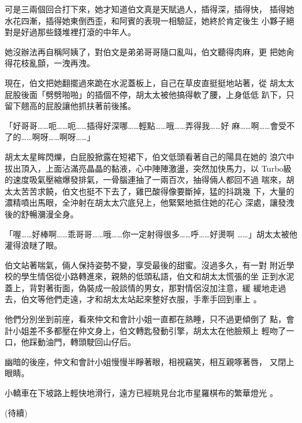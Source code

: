 可是三兩個回合打下來，她才知道伯文真是天賦過人，插得深，插得快，
插得她水花四漸，插得她東倒西歪，和阿賓的表現一相驗証，她終於肯定後生
小夥子絕對是好過那些錢堆裡打滾的中年人。

她沒辦法再自稱阿姨了，對伯文是弟弟哥哥隨口亂叫，伯文聽得肉麻，更
把她肏得花枝亂顫，一洩再洩。

現在，伯文把她翻擺過來跪在水泥蓋板上，自己在草皮直挺挺地站著，從
胡太太屁股後面「劈劈啪啪」的插個不停，胡太太被他搞得軟了腰，上身低低
趴下，只留下翹高的屁股讓他抓扶著前後搖。

「好哥哥……呃……呃……插得好深哪……輕點……哦……弄得我……好
麻……啊……會受不了的……啊呀……啊呀……」

胡太太星眸閃爍，白屁股掀露在短裙下，伯文低頭看著自己的陽具在她的
浪穴中拔出頂入，上面沾滿亮晶晶的黏液，心中陣陣激盪，突然加快馬力，以
Turbo級的速度吸氣壓縮爆發排氣，一骨腦連抽了一兩百次，抽得倆人都回不過
喘來，胡太太苦苦求饒，伯文也挺不下去了，雞巴酸得像要斷掉，猛的抖跳幾
下，大量的濃精噴出馬眼，全沖射在胡太太穴底兒上，他緊緊地抵住她的花心
深處，讓發洩後的舒暢瀰漫全身。

「喔……好棒啊……乖哥哥……哦……你一定射得很多……呼……好燙啊
……」胡太太被他灌得浪瞇了眼。

伯文站著喘氣，倆人保持姿勢不變，享受最後的甜蜜。沒過多久，有一對
附近學校的學生情侶從小路轉進來，親熱的低頭私語，伯文和胡太太慌張的坐
正到水泥蓋上，背對著街面，偽裝成一般談情的男女，那對情侶沒加注意，緩
緩地走過去，伯文等他們走遠，才和胡太太站起來整好衣服，手牽手回到車上
。

他們分別坐到前座，看來仲文和會計小姐一直都在熟睡，只不過更傾倒了
點，會計小姐差不多都壓在仲文身上，伯文轉匙發動引擎，胡太太在他臉頰上
輕吻了一口，他踩動油門，轉頭駛回山仔后。

幽暗的後座，仲文和會計小姐慢慢半睜著眼，相視竊笑，相互親啄著唇，
又閉上眼睛。

小轎車在下坡路上輕快地滑行，遠方已經眺見台北市星羅棋布的繁華燈光
。

(待續)










